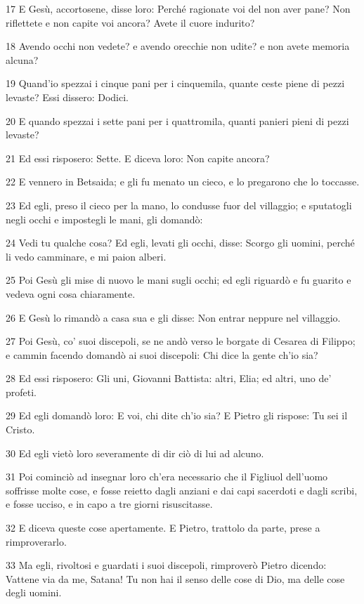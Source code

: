\par 17 E Gesù, accortosene, disse loro: Perché ragionate voi del non aver pane? Non riflettete e non capite voi ancora? Avete il cuore indurito?
\par 18 Avendo occhi non vedete? e avendo orecchie non udite? e non avete memoria alcuna?
\par 19 Quand'io spezzai i cinque pani per i cinquemila, quante ceste piene di pezzi levaste? Essi dissero: Dodici.
\par 20 E quando spezzai i sette pani per i quattromila, quanti panieri pieni di pezzi levaste?
\par 21 Ed essi risposero: Sette. E diceva loro: Non capite ancora?
\par 22 E vennero in Betsaida; e gli fu menato un cieco, e lo pregarono che lo toccasse.
\par 23 Ed egli, preso il cieco per la mano, lo condusse fuor del villaggio; e sputatogli negli occhi e impostegli le mani, gli domandò:
\par 24 Vedi tu qualche cosa? Ed egli, levati gli occhi, disse: Scorgo gli uomini, perché li vedo camminare, e mi paion alberi.
\par 25 Poi Gesù gli mise di nuovo le mani sugli occhi; ed egli riguardò e fu guarito e vedeva ogni cosa chiaramente.
\par 26 E Gesù lo rimandò a casa sua e gli disse: Non entrar neppure nel villaggio.
\par 27 Poi Gesù, co' suoi discepoli, se ne andò verso le borgate di Cesarea di Filippo; e cammin facendo domandò ai suoi discepoli: Chi dice la gente ch'io sia?
\par 28 Ed essi risposero: Gli uni, Giovanni Battista: altri, Elia; ed altri, uno de' profeti.
\par 29 Ed egli domandò loro: E voi, chi dite ch'io sia? E Pietro gli rispose: Tu sei il Cristo.
\par 30 Ed egli vietò loro severamente di dir ciò di lui ad alcuno.
\par 31 Poi cominciò ad insegnar loro ch'era necessario che il Figliuol dell'uomo soffrisse molte cose, e fosse reietto dagli anziani e dai capi sacerdoti e dagli scribi, e fosse ucciso, e in capo a tre giorni risuscitasse.
\par 32 E diceva queste cose apertamente. E Pietro, trattolo da parte, prese a rimproverarlo.
\par 33 Ma egli, rivoltosi e guardati i suoi discepoli, rimproverò Pietro dicendo: Vattene via da me, Satana! Tu non hai il senso delle cose di Dio, ma delle cose degli uomini.
